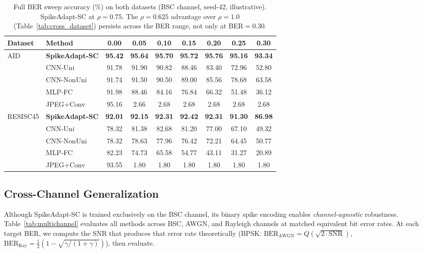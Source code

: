 \documentclass[conference]{IEEEtran}
\begin{document}
\begin{table}[t]
\renewcommand{\arraystretch}{1.15}
\centering
\small
\caption{Full BER sweep accuracy (\%) on both datasets (BSC channel, seed-42, illustrative). SpikeAdapt-SC at $\rho{=}0.75$. The $\rho{=}0.625$ advantage over $\rho{=}1.0$ (Table~\ref{tab:cross_dataset}) persists across the BER range, not only at BER${=}0.30$.}
\label{tab:ber_sweep}
\setlength{\tabcolsep}{3pt}
\begin{tabular}{ll ccccccc}
\toprule
\textbf{Dataset} & \textbf{Method} & \textbf{0.00} & \textbf{0.05} & \textbf{0.10} & \textbf{0.15} & \textbf{0.20} & \textbf{0.25} & \textbf{0.30} \\
\midrule
\multirow{5}{*}{AID} & \textbf{SpikeAdapt-SC} & \textbf{95.42} & \textbf{95.64} & \textbf{95.70} & \textbf{95.72} & \textbf{95.76} & \textbf{95.16} & \textbf{93.34} \\
 & CNN-Uni & 91.78 & 91.90 & 90.82 & 88.46 & 83.40 & 72.96 & 52.80 \\
 & CNN-NonUni & 91.74 & 91.50 & 90.50 & 89.00 & 85.56 & 78.68 & 63.58 \\
 & MLP-FC & 91.98 & 88.46 & 84.16 & 76.84 & 66.32 & 51.48 & 36.12 \\
 & JPEG+Conv & 95.16 & 2.66 & 2.68 & 2.68 & 2.68 & 2.68 & 2.68 \\
\midrule
\multirow{5}{*}{RESISC45} & \textbf{SpikeAdapt-SC} & \textbf{92.01} & \textbf{92.15} & \textbf{92.31} & \textbf{92.42} & \textbf{92.31} & \textbf{91.30} & \textbf{86.98} \\
 & CNN-Uni & 78.32 & 81.38 & 82.68 & 81.20 & 77.00 & 67.10 & 49.32 \\
 & CNN-NonUni & 78.32 & 78.63 & 77.96 & 76.42 & 72.21 & 64.45 & 50.77 \\
 & MLP-FC & 82.23 & 74.73 & 65.58 & 54.77 & 43.11 & 31.27 & 20.89 \\
 & JPEG+Conv & 93.55 & 1.80 & 1.80 & 1.80 & 1.80 & 1.80 & 1.80 \\
\bottomrule
\end{tabular}
\end{table}



\subsection{Cross-Channel Generalization}

Although SpikeAdapt-SC is trained exclusively on the BSC channel, its binary spike encoding enables \emph{channel-agnostic} robustness. Table~\ref{tab:multichannel} evaluates all methods across BSC, AWGN, and Rayleigh channels at matched equivalent bit error rates. At each target BER, we compute the SNR that produces that error rate theoretically (BPSK: $\text{BER}_{\text{AWGN}} = Q(\sqrt{2\cdot\text{SNR}})$, $\text{BER}_{\text{Ray}} = \frac{1}{2}(1-\sqrt{\gamma/(1+\gamma)})$), then evaluate.
\end{document}
